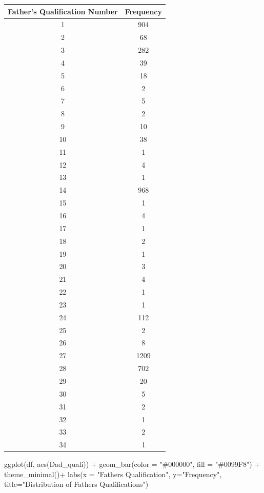 \documentclass[
]{article}
\newenvironment{Shaded}{\begin{snugshade}}{\end{snugshade}}
\newcommand{\AttributeTok}[1]{\textcolor[rgb]{0.77,0.63,0.00}{#1}}
\newcommand{\FunctionTok}[1]{\textcolor[rgb]{0.00,0.00,0.00}{#1}}
\newcommand{\NormalTok}[1]{#1}
\newcommand{\SpecialCharTok}[1]{\textcolor[rgb]{0.00,0.00,0.00}{#1}}
\newcommand{\StringTok}[1]{\textcolor[rgb]{0.31,0.60,0.02}{#1}}
\begin{document}
\begin{table}
\centering
\begin{tabular}{c|c}
\hline
Father's Qualification Number & Frequency\\
\hline
1 & 904\\
\hline
2 & 68\\
\hline
3 & 282\\
\hline
4 & 39\\
\hline
5 & 18\\
\hline
6 & 2\\
\hline
7 & 5\\
\hline
8 & 2\\
\hline
9 & 10\\
\hline
10 & 38\\
\hline
11 & 1\\
\hline
12 & 4\\
\hline
13 & 1\\
\hline
14 & 968\\
\hline
15 & 1\\
\hline
16 & 4\\
\hline
17 & 1\\
\hline
18 & 2\\
\hline
19 & 1\\
\hline
20 & 3\\
\hline
21 & 4\\
\hline
22 & 1\\
\hline
23 & 1\\
\hline
24 & 112\\
\hline
25 & 2\\
\hline
26 & 8\\
\hline
27 & 1209\\
\hline
28 & 702\\
\hline
29 & 20\\
\hline
30 & 5\\
\hline
31 & 2\\
\hline
32 & 1\\
\hline
33 & 2\\
\hline
34 & 1\\
\hline
\end{tabular}
\end{table}

\begin{Shaded}
\begin{Highlighting}[]
\FunctionTok{ggplot}\NormalTok{(df, }\FunctionTok{aes}\NormalTok{(Dad\_quali)) }\SpecialCharTok{+}
  \FunctionTok{geom\_bar}\NormalTok{(}\AttributeTok{color =} \StringTok{"\#000000"}\NormalTok{, }\AttributeTok{fill =} \StringTok{"\#0099F8"}\NormalTok{) }\SpecialCharTok{+} \FunctionTok{theme\_minimal}\NormalTok{()}\SpecialCharTok{+}
  \FunctionTok{labs}\NormalTok{(}\AttributeTok{x =} \StringTok{"Father\textquotesingle{}s Qualification"}\NormalTok{, }\AttributeTok{y=}\StringTok{"Frequency"}\NormalTok{, }\AttributeTok{title=}\StringTok{"Distribution of Father\textquotesingle{}s Qualifications"}\NormalTok{)}
\end{Highlighting}
\end{Shaded}
\end{document}

